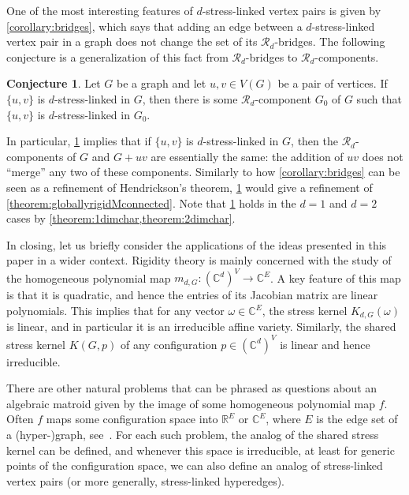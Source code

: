 \documentclass[11pt,a4paper,dvipsnames]{scrartcl}
\theoremstyle{definition}
\newtheorem{conjecture}[theorem]{Conjecture}
\newcommand{\RR}{\mathbb{R}}
\newcommand{\CC}{\mathbb{C}}
\newcommand{\strongly}[1]{${#1}$-stress-linked}
\newcommand{\stresskernel}[2]{K_{{#1},{#2}}}
\newcommand{\sharedstresskernel}[1]{K}
\begin{document}
One of the most interesting features of \strongly{d} vertex pairs is given by \cref{corollary:bridges}, which says that adding an edge between a \strongly{d} vertex pair in a graph does not change the set of its $\mathcal{R}_d$-bridges. The following conjecture is a generalization of this fact from $\mathcal{R}_d$-bridges to $\mathcal{R}_d$-components.

\begin{conjecture}\label{conjecture:Mcomp}
    Let $G$ be a graph and let $u,v \in V(G)$ be a pair of vertices. If $\{u,v\}$ is \strongly{d} in $G$, then there is some $\mathcal{R}_d$-component $G_0$ of $G$ such that $\{u,v\}$ is \strongly{d} in $G_0$.
\end{conjecture}

In particular, \cref{conjecture:Mcomp} implies that if $\{u,v\}$ is \strongly{d} in $G$, then the $\mathcal{R}_d$-components of $G$ and $G+uv$ are essentially the same: the addition of $uv$ does not ``merge'' any two of these components. Similarly to how \cref{corollary:bridges} can be seen as a refinement of Hendrickson's theorem, \cref{conjecture:Mcomp} would give a refinement of \cref{theorem:globallyrigidMconnected}. Note that \cref{conjecture:Mcomp} holds in the $d = 1$ and $d = 2$ cases by \cref{theorem:1dimchar,theorem:2dimchar}.

In closing, let us briefly consider the applications of the ideas presented in this paper in a wider context. Rigidity theory is mainly concerned with the study of the homogeneous polynomial map $m_{d,G} : (\CC^{d})^V \rightarrow \CC^E$. A key feature of this map is that it is quadratic, and hence the entries of its Jacobian matrix are linear polynomials. This implies that for any vector $\omega \in \CC^E$, 
the stress kernel $\stresskernel{d}{G}(\omega)$ is linear, and in particular it is an irreducible affine variety. Similarly, the shared stress kernel $\sharedstresskernel{d}(G,p)$ of any configuration $p \in (\CC^{d})^V$ is linear and hence irreducible.

There are other natural problems that can be phrased as questions about an algebraic matroid given by the image of some homogeneous polynomial map $f$. Often $f$ maps some configuration space into $\RR^E$ or $\CC^E$, where $E$ is the edge set of a  (hyper-)graph, see~\cite{cruickshank.etal_2023,rosen.etal_2020}. For each such problem, the analog of the shared stress kernel can be defined, and whenever this space is irreducible, at least for generic points of the configuration space, we can also define an analog of stress-linked vertex pairs (or more generally, stress-linked hyperedges). 
\end{document}
